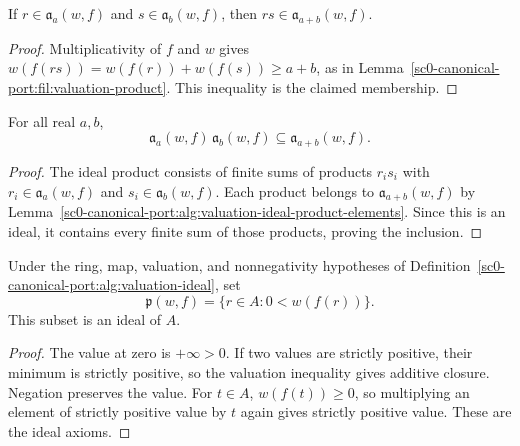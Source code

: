 \begin{lemma}
\label{sc0-canonical-port:alg:valuation-ideal-product-elements}
If \(r\in\mathfrak a_a(w,f)\) and
\(s\in\mathfrak a_b(w,f)\), then
\(rs\in\mathfrak a_{a+b}(w,f)\).
\end{lemma}
\begin{proof}
Multiplicativity of \(f\) and \(w\) gives
\(w(f(rs))=w(f(r))+w(f(s))\geq a+b\), as in
Lemma~\ref{sc0-canonical-port:fil:valuation-product}. This inequality is the claimed
membership.
\end{proof}

\begin{lemma}
\label{sc0-canonical-port:alg:valuation-ideal-product}
\leanok
For all real \(a,b\),
\[
 \mathfrak a_a(w,f)\,\mathfrak a_b(w,f)
 \subseteq\mathfrak a_{a+b}(w,f).
\]
\end{lemma}
\begin{proof}
The ideal product consists of finite sums of products \(r_i s_i\)
with \(r_i\in\mathfrak a_a(w,f)\) and
\(s_i\in\mathfrak a_b(w,f)\). Each product belongs to
\(\mathfrak a_{a+b}(w,f)\) by
Lemma~\ref{sc0-canonical-port:alg:valuation-ideal-product-elements}. Since this is an
ideal, it contains every finite sum of those products, proving the
inclusion.
\end{proof}

\begin{definition}
\label{sc0-canonical-port:alg:positive-valuation-ideal}
\leanok
Under the ring, map, valuation, and nonnegativity hypotheses of
Definition~\ref{sc0-canonical-port:alg:valuation-ideal}, set
\[
 \mathfrak p(w,f)=\{r\in A:0<w(f(r))\}.
\]
This subset is an ideal of \(A\).
\end{definition}
\begin{proof}
The value at zero is \(+\infty>0\). If two values are strictly
positive, their minimum is strictly positive, so the valuation
inequality gives additive closure. Negation preserves the value.
For \(t\in A\), \(w(f(t))\geq0\), so multiplying an element
of strictly positive value by \(t\) again gives strictly positive
value. These are the ideal axioms.
\end{proof}

